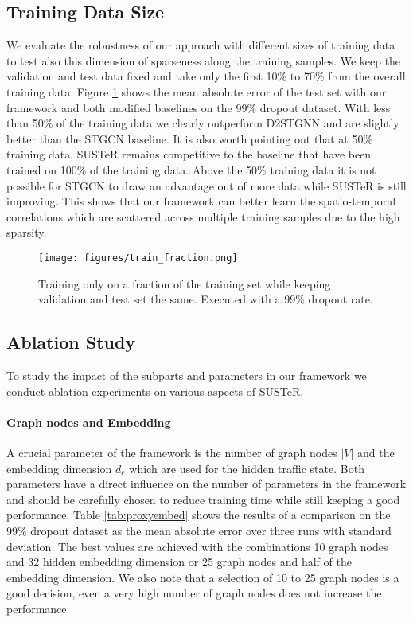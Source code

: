 \subsection{Training Data Size}
We evaluate the robustness of our approach with different sizes of training data to test also this dimension of sparseness along the training samples.
We keep the validation and test data fixed and take only the first 10\% to 70\% from the overall training data.
Figure \ref{fig:fraction_training_data} shows the mean absolute error of the test set with our framework and both modified baselines on the 99\% dropout dataset.
With less than 50\% of the training data we clearly outperform D2STGNN and are slightly better than the STGCN baseline.
It is also worth pointing out that at 50\% training data, SUSTeR remains competitive to the baseline that have been trained on 100\% of the training data.
Above the 50\% training data it is not possible for STGCN to draw an advantage out of more data while SUSTeR is still improving.
This shows that our framework can better learn the spatio-temporal correlations which are scattered across multiple training samples due to the high sparsity.

\begin{figure}[ht]
    \centering
    \texttt{[image: figures/train\_fraction.png]}
    \caption{Training only on a fraction of the training set while keeping validation and test set the same. Executed with a 99\% dropout rate.}
    \label{fig:fraction_training_data}
\end{figure}


\subsection{Ablation Study}
\label{subsec:ablation}

To study the impact of the subparts and parameters in our framework we conduct ablation experiments on various aspects of SUSTeR.

\paragraph{\textbf{Graph nodes and Embedding}} 
A crucial parameter of the framework is the number of graph nodes $|V|$ and the embedding dimension $d_e$ which are used for the hidden traffic state.
Both parameters have a direct influence on the number of parameters in the framework and should be carefully chosen to reduce training time while still keeping a good performance.
Table \ref{tab:proxyembed} shows the results of a comparison on the 99\% dropout dataset as the mean absolute error over three runs with standard deviation.
The best values are achieved with the combinations 10 graph nodes and 32 hidden embedding dimension or 25 graph nodes and half of the embedding dimension. 
We also note that a selection of 10 to 25 graph nodes is a good decision, even a very high number of graph nodes does not increase the performance 

